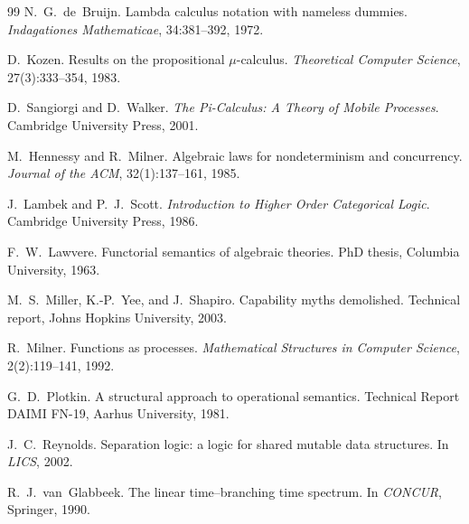 \begin{thebibliography}{99}
N.~G.~de~Bruijn.
\newblock Lambda calculus notation with nameless dummies.
\newblock \emph{Indagationes Mathematicae}, 34:381--392, 1972.

D.~Kozen. \newblock Results on the propositional $\mu$-calculus. \newblock \emph{Theoretical Computer Science}, 27(3):333--354, 1983.

D.~Sangiorgi and D.~Walker. \newblock \emph{The Pi-Calculus: A Theory of Mobile Processes}. \newblock Cambridge University Press, 2001.

M.~Hennessy and R.~Milner.
\newblock Algebraic laws for nondeterminism and concurrency.
\newblock \emph{Journal of the ACM}, 32(1):137--161, 1985.

J.~Lambek and P.~J.~Scott.
\newblock \emph{Introduction to Higher Order Categorical Logic}.
\newblock Cambridge University Press, 1986.

F.~W.~Lawvere.
\newblock Functorial semantics of algebraic theories.
\newblock PhD thesis, Columbia University, 1963.

M.~S.~Miller, K.-P.~Yee, and J.~Shapiro.
\newblock Capability myths demolished.
\newblock Technical report, Johns Hopkins University, 2003.

R.~Milner.
\newblock Functions as processes.
\newblock \emph{Mathematical Structures in Computer Science}, 2(2):119--141, 1992.

G.~D.~Plotkin.
\newblock A structural approach to operational semantics.
\newblock Technical Report DAIMI FN-19, Aarhus University, 1981.

J.~C.~Reynolds.
\newblock Separation logic: a logic for shared mutable data structures.
\newblock In \emph{LICS}, 2002.

R.~J.~van~Glabbeek.
\newblock The linear time--branching time spectrum.
\newblock In \emph{CONCUR}, Springer, 1990.



\end{thebibliography}
